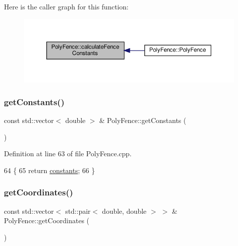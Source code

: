 Here is the caller graph for this function\+:\nopagebreak
\begin{figure}[H]
\begin{center}
\leavevmode
\includegraphics[width=350pt]{d1/d22/class_poly_fence_a229de6f5987bf7d312310b522db0d5a4_icgraph}
\end{center}
\end{figure}
\mbox{\label{class_poly_fence_a8eb326a3ea522915ee2d343e838730d8}} 
\subsubsection{\texorpdfstring{get\+Constants()}{getConstants()}}
{\footnotesize\ttfamily const std\+::vector$<$ double $>$ \& Poly\+Fence\+::get\+Constants (\begin{DoxyParamCaption}{ }\end{DoxyParamCaption})}



Definition at line 63 of file Poly\+Fence.\+cpp.


\begin{DoxyCode}
64 \{
65     \textcolor{keywordflow}{return} \hyperlink{class_poly_fence_a24c99bb8a45f86bdf51cd3f22ef0f174}{constants};
66 \}
\end{DoxyCode}
\mbox{\label{class_poly_fence_ac21701adcb8af5b77872d7659318af72}} 
\subsubsection{\texorpdfstring{get\+Coordinates()}{getCoordinates()}}
{\footnotesize\ttfamily const std\+::vector$<$ std\+::pair$<$ double, double $>$ $>$ \& Poly\+Fence\+::get\+Coordinates (\begin{DoxyParamCaption}{ }\end{DoxyParamCaption})}



